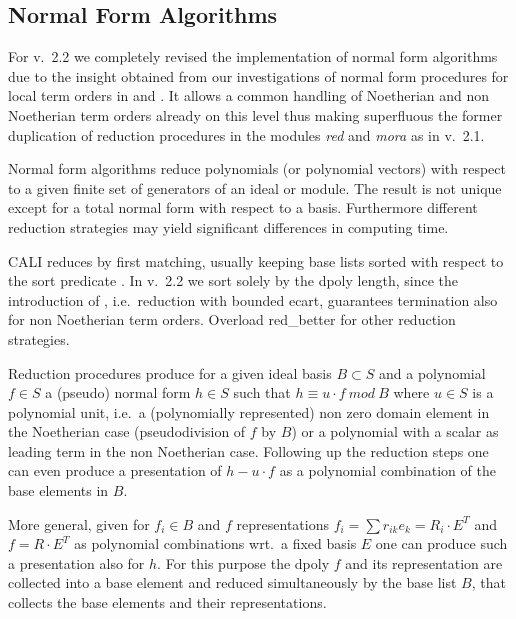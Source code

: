 \subsection{Normal Form Algorithms}

For v.\ 2.2 we completely revised the implementation of normal form
algorithms due to the insight obtained from our investigations of
normal form procedures for local term orders in \cite{ala} and
\cite{tcah}. It allows a common handling of Noetherian and non
Noetherian term orders already on this level thus making superfluous
the former duplication of reduction procedures in the modules {\em
red} and {\em mora} as in v.\ 2.1.
\medskip

Normal form algorithms reduce polynomials (or polynomial vectors)
with respect to a given finite set of generators of an ideal or
module. The result is not unique except for a total normal form with
respect to a \gr basis. Furthermore different reduction strategies
may yield significant differences in computing time.

CALI reduces by first matching, usually keeping base lists sorted
with respect to the sort predicate . In v.\ 2.2 we
sort solely by the dpoly length, since the introduction of
, i.e.\ reduction with bounded ecart, guarantees
termination also for non Noetherian term orders. Overload red\_better
for other reduction strategies. 
\medskip

Reduction procedures produce for a given ideal basis $B\subset S$ and
a polynomial $f\in S$ a (pseudo) normal form $h\in S$ such that
$h\equiv u\cdot f\ mod\ B$ where $u\in S$ is a polynomial unit, i.e.\
a (polynomially represented) non zero domain element in the Noetherian
case (pseudodivision of $f$ by $B$) or a polynomial with a scalar as
leading term in the non Noetherian case. Following up the reduction
steps one can even produce a presentation of $h-u\cdot f$ as a
polynomial combination of the base elements in $B$.

More general, given for $f_i\in B$ and $f$ representations $f_i =
\sum{r_{ik}e_k} = R_i\cdot E^T$ and $f=R\cdot E^T$ as polynomial
combinations wrt.\ a fixed basis $E$ one can produce such a
presentation also for $h$. For this purpose the dpoly $f$ and its
representation are collected into a base element and reduced
simultaneously by the base list $B$, that collects the base elements
and their representations. 
\medskip

